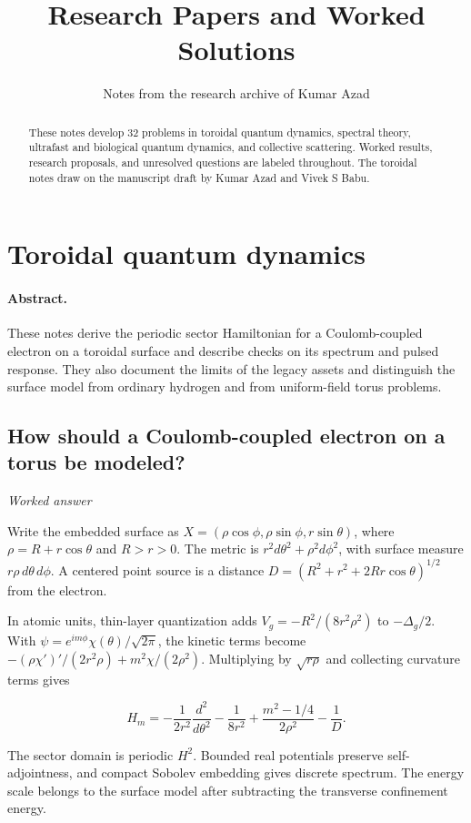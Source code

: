 \documentclass[11pt]{article}
\title{Research Papers and Worked Solutions}
\author{Notes from the research archive of Kumar Azad}
\date{}
\begin{document}
\maketitle
\begin{abstract}
These notes develop 32 problems in toroidal quantum dynamics, spectral theory,
ultrafast and biological quantum dynamics, and collective scattering.
Worked results, research proposals, and unresolved questions are labeled
throughout. The toroidal notes draw on the manuscript draft by Kumar Azad
and Vivek S Babu.
\end{abstract}
\tableofcontents

\section{Toroidal quantum dynamics}
\paragraph{Abstract.} These notes derive the periodic sector Hamiltonian for a Coulomb-coupled electron on a toroidal surface and describe checks on its spectrum and pulsed response. They also document the limits of the legacy assets and distinguish the surface model from ordinary hydrogen and from uniform-field torus problems.

\subsection{How should a Coulomb-coupled electron on a torus be modeled?}
\label{problem:torus-model}
\textit{Worked answer}

Write the embedded surface as \(X=(\rho\cos\phi,\rho\sin\phi,r\sin\theta)\), where \(\rho=R+r\cos\theta\) and \(R>r>0\). The metric is \(r^2d\theta^2+\rho^2d\phi^2\), with surface measure \(r\rho\,d\theta\,d\phi\). A centered point source is a distance \(D=(R^2+r^2+2Rr\cos\theta)^{1/2}\) from the electron.

In atomic units, thin-layer quantization adds \(V_g=-R^2/(8r^2\rho^2)\) to \(-\Delta_g/2\). With \(\psi=e^{im\phi}\chi(\theta)/\sqrt{2\pi}\), the kinetic terms become \(-(\rho\chi')'/(2r^2\rho)+m^2\chi/(2\rho^2)\). Multiplying by \(\sqrt{r\rho}\) and collecting curvature terms gives

\[H_m=-\frac{1}{2r^2}\frac{d^2}{d\theta^2}-\frac{1}{8r^2}+\frac{m^2-1/4}{2\rho^2}-\frac{1}{D}.\]

The sector domain is periodic \(H^2\). Bounded real potentials preserve self-adjointness, and compact Sobolev embedding gives discrete spectrum. The energy scale belongs to the surface model after subtracting the transverse confinement energy.
\end{document}
